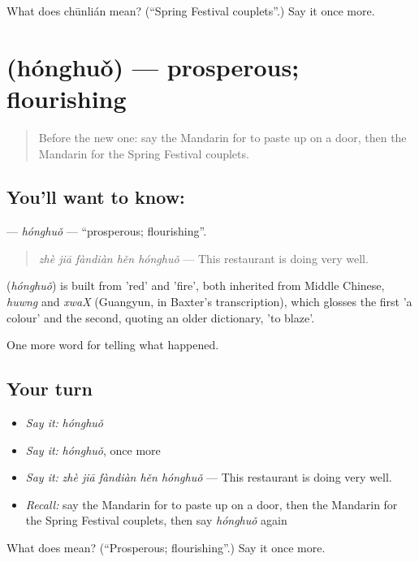 \begin{tcolorbox}[breakable,colback=teal!4,colframe=teal!35!black,title={Before you move on}]
What does chūnlián mean? (\textquotedblleft{}Spring Festival couplets\textquotedblright{}.) Say it once more.
\end{tcolorbox}
\section[\texorpdfstring{\zh{红火} (hónghuǒ)}{红火 (hónghuǒ)}]{ (hónghuǒ) — prosperous; flourishing}

\label{lesson:ZH-C334-honghuo}



\begin{quote}
Before the new one: say the Mandarin for to paste up on a door, then the Mandarin for the Spring Festival couplets.
\end{quote}

\subsection*{You'll want to know: }
\textbf{} — \emph{hónghuǒ} — \textquotedblleft{}prosperous; flourishing\textquotedblright{}.

\begin{quote}
\textbf{} \emph{zhè jiā fàndiàn hěn hónghuǒ} — This restaurant is doing very well.
\end{quote}

\begin{cousinweb}
\textbf{} (\emph{hónghuǒ}) is built from  'red' and  'fire', both inherited from Middle Chinese, \emph{huwng} and \emph{xwaX} (Guangyun, in Baxter's transcription), which glosses the first 'a colour' and the second, quoting an older dictionary, 'to blaze'.
\end{cousinweb}

\begin{grammarlens}[title={What you've built}]
One more word for telling what happened.
\end{grammarlens}

\subsection*{Your turn}
\begin{itemize}
\raggedright
  \item \emph{Say it:} \emph{hónghuǒ}
  \item \emph{Say it:} \emph{hónghuǒ}, once more
  \item \emph{Say it:} \emph{zhè jiā fàndiàn hěn hónghuǒ} — This restaurant is doing very well.
  \item \emph{Recall:} say the Mandarin for to paste up on a door, then the Mandarin for the Spring Festival couplets, then say \emph{hónghuǒ} again
\end{itemize}

\begin{tcolorbox}[breakable,colback=teal!4,colframe=teal!35!black,title={Before you move on}]
What does  mean? (\textquotedblleft{}Prosperous; flourishing\textquotedblright{}.) Say it once more.
\end{tcolorbox}
